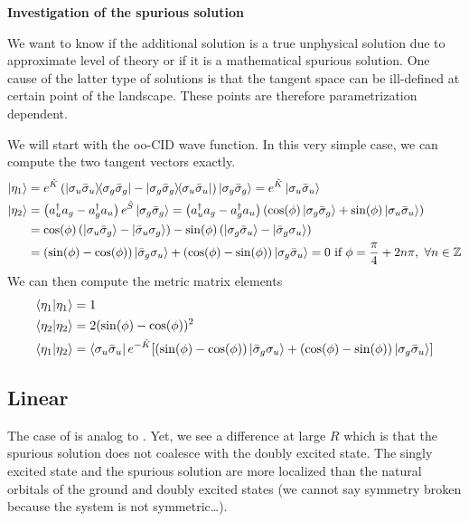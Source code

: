 \documentclass[11pt,a4paper]{article}
\newcommand{\hK}{\Hat{K}} %
\newcommand{\hS}{\Hat{S}}
\newcommand{\cre}[1]{a_{#1}^\dagger} %
\newcommand{\ani}[1]{a_{#1}} %
\begin{document}
\textbf{Investigation of the spurious solution}

We want to know if the additional solution is a true unphysical solution due to approximate level of theory or if it is a mathematical spurious solution.
One cause of the latter type of solutions is that the tangent space can be ill-defined at certain point of the landscape. These points are therefore parametrization dependent.

We will start with the oo-CID wave function. In this very simple case, we can compute the two tangent vectors exactly.
\begin{align}
  \label{eq:H2_TangentVectors}
  \ket{\eta_1} &= e^{\hK} \left(\ketbra{\sigma_u\bar{\sigma}_u}{\sigma_g\bar{\sigma}_g} -\ketbra{\sigma_g\bar{\sigma}_g}{\sigma_u\bar{\sigma}_u}\right)\ket{\sigma_g\bar{\sigma}_g} = e^{\hK} \ket{\sigma_u\bar{\sigma}_u} \\
  \ket{\eta_2} &= \left(\cre{u}\ani{g} - \cre{g}\ani{u}\right)e^{\hS}\ket{\sigma_g\bar{\sigma}_g} = \left(\cre{u}\ani{g} - \cre{g}\ani{u}\right)\left(\cos(\phi)\ket{\sigma_g\bar{\sigma}_g} + \sin(\phi)\ket{\sigma_u\bar{\sigma}_u}\right) \\
               &= \cos(\phi)\left(\ket{\sigma_u\bar{\sigma}_g}-\ket{\bar{\sigma}_u\sigma_g}\right) - \sin(\phi)\left(\ket{\sigma_g\bar{\sigma}_u}-\ket{\bar{\sigma}_g\sigma_u}\right) \\
  &= \left(\sin(\phi)-\cos(\phi)\right)\ket{\bar{\sigma}_g\sigma_u} + \left(\cos(\phi)-\sin(\phi)\right)\ket{\sigma_g\bar{\sigma}_u} = 0~\text{if}~\phi = \frac{\pi}{4} + 2n\pi,~\forall n\in \mathbb{Z}
\end{align}
We can then compute the metric matrix elements
\begin{align}
  \braket{\eta_1}{\eta_1} &= 1 \\
  \braket{\eta_2}{\eta_2} &= 2(\sin(\phi)-\cos(\phi))^2 \\
  \braket{\eta_1}{\eta_2} &= \bra{\sigma_u\bar{\sigma}_u}e^{-\hK}\mleft[\left(\sin(\phi)-\cos(\phi)\right)\ket{\bar{\sigma}_g\sigma_u} + \left(\cos(\phi)-\sin(\phi)\right)\ket{\sigma_g\bar{\sigma}_u}\mright]
\end{align}

\subsection{Linear }

The case of  is analog to . Yet, we see a difference at large $R$ which is that the spurious solution does not coalesce with the doubly excited state.
The singly excited state and the spurious solution are more localized than the natural orbitals of the ground and doubly excited states (we cannot say symmetry broken because the system is not symmetric\dots). 
\end{document}
